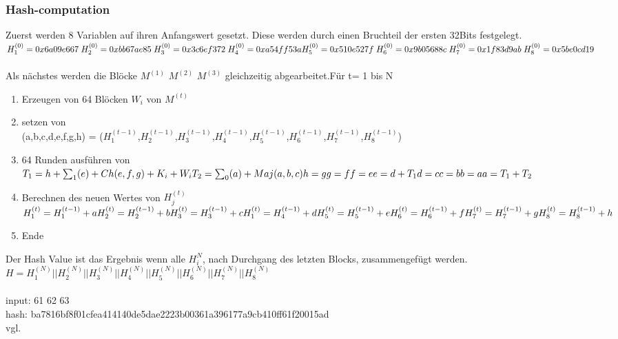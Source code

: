 {\subsubsection{Hash-computation}
\label{sec:hash-computation}
Zuerst werden 8 Variablen auf ihren Anfangswert gesetzt. Diese werden durch einen Bruchteil der ersten 32Bits festgelegt.\\
$H_1^{(0)} = 0x6a09e667\;  H_2^{(0)} = 0xbb67ae85\;   H_3^{(0)} = 0x3c6ef372 \;  H_4^{(0)} = 0xa54ff53a \\H_5^{(0)} = 0x510e527f\;  H_6^{(0)} = 0x9b05688c\;  H_7^{(0)} = 0x1f83d9ab\;H_8^{(0)} = 0x5be0cd19\;    $\\ \\
Als nächstes werden die Blöcke $M^{(1)}$ $M^{(2)}$ $M^{(3)}$ gleichzeitig abgearbeitet.Für t= 1 bis N
\begin{enumerate}
\item Erzeugen von 64 Blöcken $W_i$ von $M^{(t)}$
\item setzen von \\(a,b,c,d,e,f,g,h) = ($H_1^{(t-1)}$,$H_2^{(t-1)}$,$H_3^{(t-1)}$,$H_4^{(t-1)}$,$H_5^{(t-1)}$,$H_6^{(t-1)}$,$H_7^{(t-1)}$,$H_8^{(t-1)}$)
\item 64 Runden ausführen von\\$T_1 = h + {\sum_1} (e) + Ch(e, f, g) + K_i + W_i\\T_2 = \sum_0(a) + Maj(a,b,c)\\h = g\\g=f\\f=e\\e=d+ T_1\\d=c\\c=b\\b=a\\a=T_1+T_2$
\item Berechnen des neuen Wertes von $H_j^{(t)}$\\$H_1^{(t)}  = H_1^{(t-1)} + a \\H_2^{(t)}  = H_2^{(t-1)} + b \\H_3^{(t)}  = H_3^{(t-1)} + c \\H_1^{(t)}  = H_4^{(t-1)} + d \\H_5^{(t)}  = H_5^{(t-1)} + e \\H_6^{(t)}  = H_6^{(t-1)} + f \\H_7^{(t)}  = H_7^{(t-1)} + g \\H_8^{(t)}  = H_8^{(t-1)} + h$
\item Ende
\end{enumerate}
Der Hash Value ist das Ergebnis wenn alle $H_i^N$, nach Durchgang des letzten Blocks, zusammengefügt werden.\\$H = H_1^{(N)} || H_2^{(N)} || H_3^{(N)} || H_4^{(N)} || H_5^{(N)} || H_6^{(N)} || H_7^{(N)} || H_8^{(N)}$\\ \\
input: 61 62 63 \\
hash: ba7816bf8f01cfea414140de5dae2223b00361a396177a9cb410ff61f20015ad\\
vgl. \textcite{sha256}
}
